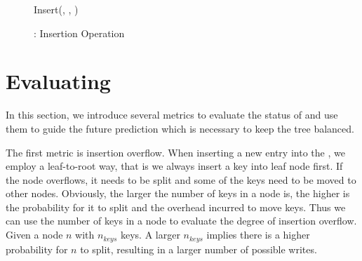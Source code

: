\begin{figure}[!t]
\linesnumbered
\begin{algorithm}[H]
\caption{Insert(\bplustree, \bptree, \key{})}
\KwIn{\bplustree, \bptree, \key{}}
\label{alg:alg1}

\end{algorithm}


\begin{function} [H]
\end{function}

\caption{\bptree: Insertion Operation}\label{alg:insertion}
\end{figure}

\section{Evaluating {\large \bptree}}
\label{sec:cost}

In this section, we introduce several metrics to evaluate
the status of \bptree and use them to guide the future prediction which is necessary to keep the tree balanced.

The first metric is insertion overflow.
When inserting a new entry into the \bptree, we employ a leaf-to-root way, that is we always insert a key into leaf node first. If the node overflows, it needs to be split and some of the keys need to be moved to other nodes.
Obviously, the larger the number of keys in a node is, the higher is the
probability for it to split and the overhead incurred
to move keys. Thus we can use the number of keys in a node to
evaluate the degree of insertion overflow.
Given a node $n$ with $n_{keys}$ keys.
A larger $n_{keys}$ implies there is a higher probability for $n$
to split, resulting in a larger number of possible writes.

